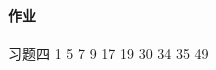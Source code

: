 \documentclass{ctexart}
\begin{document}

\paragraph{作业} %
\label{par:作业}

习题四 1 5 7 9 17 19 30 34 35 49


\end{document}
